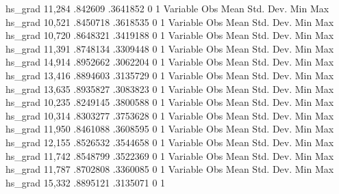      hs_grad {\VBAR}     11,284     .842609    .3641852          0          1
{\smallskip}
    Variable {\VBAR}        Obs        Mean    Std. Dev.       Min        Max
     hs_grad {\VBAR}     10,521    .8450718    .3618535          0          1
{\smallskip}
    Variable {\VBAR}        Obs        Mean    Std. Dev.       Min        Max
     hs_grad {\VBAR}     10,720    .8648321    .3419188          0          1
{\smallskip}
    Variable {\VBAR}        Obs        Mean    Std. Dev.       Min        Max
     hs_grad {\VBAR}     11,391    .8748134    .3309448          0          1
{\smallskip}
    Variable {\VBAR}        Obs        Mean    Std. Dev.       Min        Max
     hs_grad {\VBAR}     14,914    .8952662    .3062204          0          1
{\smallskip}
    Variable {\VBAR}        Obs        Mean    Std. Dev.       Min        Max
     hs_grad {\VBAR}     13,416    .8894603    .3135729          0          1
{\smallskip}
    Variable {\VBAR}        Obs        Mean    Std. Dev.       Min        Max
     hs_grad {\VBAR}     13,635    .8935827    .3083823          0          1
{\smallskip}
    Variable {\VBAR}        Obs        Mean    Std. Dev.       Min        Max
     hs_grad {\VBAR}     10,235    .8249145    .3800588          0          1
{\smallskip}
    Variable {\VBAR}        Obs        Mean    Std. Dev.       Min        Max
     hs_grad {\VBAR}     10,314    .8303277    .3753628          0          1
{\smallskip}
    Variable {\VBAR}        Obs        Mean    Std. Dev.       Min        Max
     hs_grad {\VBAR}     11,950    .8461088    .3608595          0          1
{\smallskip}
    Variable {\VBAR}        Obs        Mean    Std. Dev.       Min        Max
     hs_grad {\VBAR}     12,155    .8526532    .3544658          0          1
{\smallskip}
    Variable {\VBAR}        Obs        Mean    Std. Dev.       Min        Max
     hs_grad {\VBAR}     11,742    .8548799    .3522369          0          1
{\smallskip}
    Variable {\VBAR}        Obs        Mean    Std. Dev.       Min        Max
     hs_grad {\VBAR}     11,787    .8702808    .3360085          0          1
{\smallskip}
    Variable {\VBAR}        Obs        Mean    Std. Dev.       Min        Max
     hs_grad {\VBAR}     15,332    .8895121    .3135071          0          1
